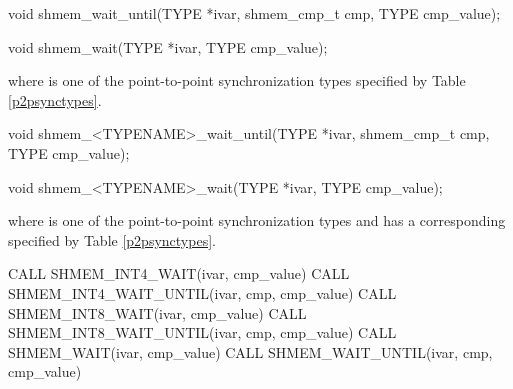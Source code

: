 
\begin{apidefinition}

\begin{C11synopsis}
void shmem_wait_until(TYPE *ivar, shmem_cmp_t cmp, TYPE cmp_value);
\end{C11synopsis}
\begin{DeprecateBlock}
\begin{CsynopsisCol}
void shmem_wait(TYPE *ivar, TYPE cmp_value);
\end{CsynopsisCol}
\end{DeprecateBlock}
where \TYPE{} is one of the point-to-point synchronization types specified by
Table \ref{p2psynctypes}.

\begin{Csynopsis}
void shmem_<TYPENAME>_wait_until(TYPE *ivar, shmem_cmp_t cmp, TYPE cmp_value);
\end{Csynopsis}
\begin{DeprecateBlock}
\begin{CsynopsisCol}
void shmem_<TYPENAME>_wait(TYPE *ivar, TYPE cmp_value);
\end{CsynopsisCol}
\end{DeprecateBlock}
where \TYPE{} is one of the point-to-point synchronization types and has a
corresponding \TYPENAME{} specified by Table \ref{p2psynctypes}.

\begin{Fsynopsis}
CALL SHMEM_INT4_WAIT(ivar, cmp_value)
CALL SHMEM_INT4_WAIT_UNTIL(ivar, cmp, cmp_value)
CALL SHMEM_INT8_WAIT(ivar, cmp_value)
CALL SHMEM_INT8_WAIT_UNTIL(ivar, cmp, cmp_value)
CALL SHMEM_WAIT(ivar, cmp_value)
CALL SHMEM_WAIT_UNTIL(ivar, cmp, cmp_value)
\end{Fsynopsis}

\begin{apiarguments}



\end{apiarguments}
\end{apidefinition}
